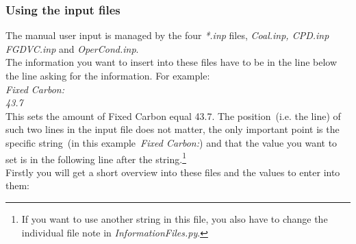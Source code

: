 \subsubsection{Using the input files}\label{SSS_inp}
The manual user input is managed by the four \emph{*.inp} files, \emph{Coal.inp, CPD.inp} \emph{FGDVC.inp} and \emph{OperCond.inp}.\\
The information you want to insert into these files have to be in the line below the line asking for the information. For example:\\

\noindent \emph{Fixed Carbon:\\
43.7}\\

This sets the amount of Fixed Carbon equal 43.7. The position~(i.e. the line) of such two lines in the input file does not matter, the only important point is the specific string~(in this example~\emph{Fixed Carbon:}) and that the value you want to set is in the following line after the string.\footnote{If you want to use another string in this file, you also have to change the individual file note in \emph{InformationFiles.py}.}\\
Firstly you will get a short overview into these files and the values to enter into them:\\
